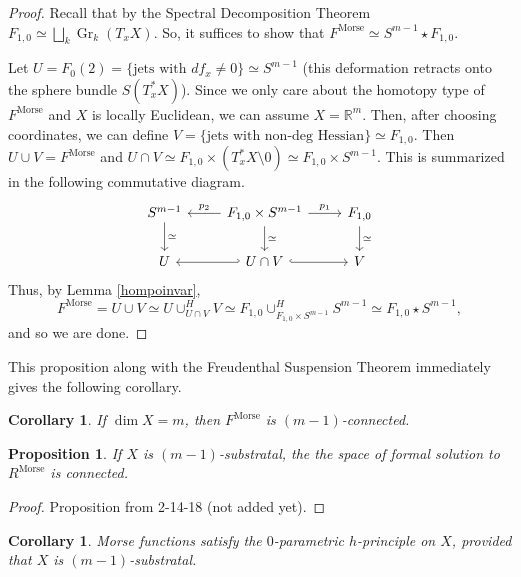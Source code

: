 \documentclass{article}
\newtheorem{proposition}[theorem]{Proposition}
\newtheorem{corollary}[theorem]{Corollary}
\newtheorem{proposed work}[theorem]{Proposed Work}
\DeclareMathOperator{\Morse}{Morse}
\DeclareMathOperator{\Gr}{Gr}
\begin{document}
\begin{proof}
Recall that by the Spectral Decomposition Theorem $F_{1,0} \simeq \bigsqcup_k \Gr_k(T_x X)$. So, it suffices to show that $F^{\Morse} \simeq S^{m-1} \star F_{1,0}$. 

Let $U = F_0{(2)} =  \{ \text{jets with } df_x \neq 0\} \simeq S^{m-1}$ (this deformation retracts onto the sphere bundle $S(T_x^* X)$). Since we only care about the homotopy type of $F^{\Morse}$ and $X$ is locally Euclidean, we can assume $X = \mathbb{R}^m$. Then, after choosing coordinates, we can define $V = \{ \text{jets with non-deg Hessian} \} \simeq F_{1,0}$.  Then $U \cup V = F^{\Morse}$ and $U \cap V \simeq F_{1,0} \times \left( T_x^* X \setminus 0 \right) \simeq F_{1,0} \times S^{m-1}$. This is summarized in the following commutative diagram.
\begin{equation*}
\begin{tikzcd}
S^{m-1} \arrow[d, "\simeq"] & F_{1,0} \times S^{m-1} \arrow[l,swap, "p_2"] \arrow[r, "p_1"] \arrow[d, "\simeq"] & F_{1,0} \arrow[d, "\simeq"] \\
U & U \cap V \arrow[l, hook'] \arrow[r, hook] & V
\end{tikzcd}
\end{equation*}
Thus, by Lemma \ref{hompoinvar}, 
\begin{equation*}
F^{\Morse} = U \cup V \simeq U \cup_{U \cap V}^H V \simeq F_{1,0} \cup_{F_{1,0} \times S^{m-1}}^H S^{m-1} \simeq F_{1,0} \star S^{m-1},
\end{equation*}
and so we are done.
\end{proof}

This proposition along with the Freudenthal Suspension Theorem \cite{may1999concise} immediately gives the following corollary.

\begin{corollary}
If $\dim X = m$, then $F^{\Morse}$ is $(m-1)$-connected.
\end{corollary}

\begin{proposition}
If $X$ is $(m-1)$-substratal, the the space of formal solution to $R^{\Morse}$ is connected.
\end{proposition}

\begin{proof}
Proposition from 2-14-18 (not added yet).
\end{proof}

\begin{corollary}
Morse functions satisfy the $0$-parametric $h$-principle on $X$, provided that $X$ is $(m-1)$-substratal.
\end{corollary}
\end{document}
